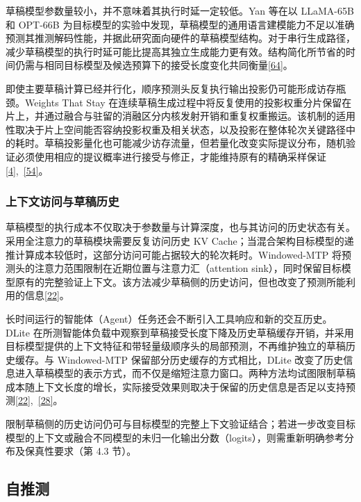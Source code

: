 \documentclass[11pt,a4paper,UTF8,fontset=none,scheme=plain,zihao=-4]{ctexart}
\begin{document}
草稿模型参数量较小，并不意味着其执行时延一定较低。Yan 等在以 LLaMA-65B
和 OPT-66B
为目标模型的实验中发现，草稿模型的通用语言建模能力不足以准确预测其推测解码性能，并据此研究面向硬件的草稿模型结构。对于串行生成路径，减少草稿模型的执行时延可能比提高其独立生成能力更有效。结构简化所节省的时间仍需与相同目标模型及候选预算下的接受长度变化共同衡量\protect\hyperlink{ref-decodingspec}{{[}64{]}}。

即使主要草稿计算已经并行化，顺序预测头反复执行输出投影仍可能形成访存瓶颈。Weights
That Stay
在连续草稿生成过程中将反复使用的投影权重分片保留在片上，并通过融合与驻留的消融区分内核发射开销和重复权重搬运。该机制的适用性取决于片上空间能否容纳投影权重及相关状态，以及投影在整体轮次关键路径中的耗时。草稿投影量化也可能减少访存流量，但若量化改变实际提议分布，随机验证必须使用相应的提议概率进行接受与修正，才能维持原有的精确采样保证\protect\hyperlink{ref-leviathan}{{[}4{]}},~\protect\hyperlink{ref-weights}{{[}54{]}}。

\hypertarget{section-3-2-3}{%
\subsubsection{上下文访问与草稿历史}\label{section-3-2-3}}

草稿模型的执行成本不仅取决于参数量与计算深度，也与其访问的历史状态有关。采用全注意力的草稿模块需要反复访问历史
KV
Cache；当混合架构目标模型的递推计算成本较低时，这部分访问可能占据较大的轮次耗时。Windowed-MTP
将预测头的注意力范围限制在近期位置与注意力汇（attention
sink），同时保留目标模型原有的完整验证上下文。该方法减少草稿侧的历史访问，但也改变了预测所能利用的信息\protect\hyperlink{ref-windowedmtp}{{[}22{]}}。

长时间运行的智能体（Agent）任务还会不断引入工具响应和新的交互历史。DLite
在所测智能体负载中观察到草稿接受长度下降及历史草稿缓存开销，并采用目标模型提供的上下文特征和带轻量级顺序头的局部预测，不再维护独立的草稿历史缓存。与
Windowed-MTP 保留部分历史缓存的方式相比，DLite
改变了历史信息进入草稿模型的表示方式，而不仅是缩短注意力窗口。两种方法均试图限制草稿成本随上下文长度的增长，实际接受效果则取决于保留的历史信息是否足以支持预测\protect\hyperlink{ref-windowedmtp}{{[}22{]}},~\protect\hyperlink{ref-dlite}{{[}28{]}}。

限制草稿侧的历史访问仍可与目标模型的完整上下文验证结合；若进一步改变目标模型的上下文或融合不同模型的未归一化输出分数（logits），则需重新明确参考分布及保真性要求（第
4.3 节）。

\hypertarget{section-3-3}{%
\subsection{自推测}\label{section-3-3}}
\end{document}
